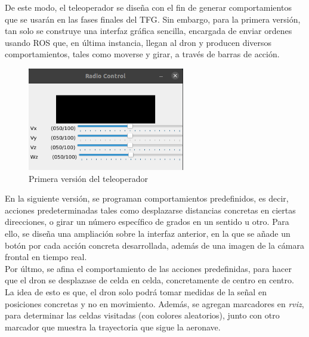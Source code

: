 De este modo, el teleoperador se diseña con el fin de generar comportamientos que se usarán en las fases finales del \ac{TFG}. Sin embargo, para la primera versión, tan solo se construye una interfaz gráfica sencilla, encargada de enviar ordenes usando \ac{ROS} que, en última instancia, llegan al dron y producen diversos comportamientos, tales como moverse y girar, a través de barras de acción.\\

\begin{figure} [H]
	\begin{center}
	\includegraphics[height=4.5cm]{imagenes/cap4/2_axes_rc.png}
	\end{center}
	\caption[Primera versión del teleoperador]{Primera versión del teleoperador}
	\label{fig:teleoperador_v1}
\end{figure}

En la siguiente versión, se programan comportamientos predefinidos, es decir, acciones predeterminadas tales como desplazarse distancias concretas en ciertas direcciones, o girar un número específico de grados en un sentido u otro. Para ello, se diseña una ampliación sobre la interfaz anterior, en la que se añade un botón por cada acción concreta desarrollada, además de una imagen de la cámara frontal en tiempo real.\\

Por últmo, se afina el comportamiento de las acciones predefinidas, para hacer que el dron se desplazase de celda en celda, concretamente de centro en centro. La idea de esto es que, el dron solo podrá tomar medidas de la señal en posiciones concretas y no en movimiento. Además, se agregan marcadores en \emph{rviz}, para determinar las celdas visitadas (con colores aleatorios), junto con otro marcador que muestra la trayectoria que sigue la aeronave.\\

